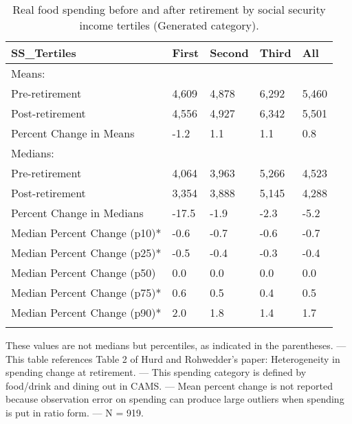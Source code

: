 \begin{table}[tbp] \centering
{}

\caption{Real food spending before and after retirement by social security income tertiles (Generated category).}
\begin{tabularx}{\textwidth}{lCCCC}

\toprule
{SS\_Tertiles}&{First}&{Second}&{Third}&{All} \tabularnewline
\midrule\addlinespace[1.5ex]
Means:&&&& \tabularnewline
\midrule Pre-retirement&4,609&4,878&6,292&5,460 \tabularnewline
Post-retirement&4,556&4,927&6,342&5,501 \tabularnewline
Percent Change in Means&-1.2&1.1&1.1&0.8 \tabularnewline
\midrule Medians:&&&& \tabularnewline
\midrule Pre-retirement&4,064&3,963&5,266&4,523 \tabularnewline
Post-retirement&3,354&3,888&5,145&4,288 \tabularnewline
Percent Change in Medians&-17.5&-1.9&-2.3&-5.2 \tabularnewline
Median Percent Change (p10)*&-0.6&-0.7&-0.6&-0.7 \tabularnewline
Median Percent Change (p25)*&-0.5&-0.4&-0.3&-0.4 \tabularnewline
Median Percent Change (p50)&0.0&0.0&0.0&0.0 \tabularnewline
Median Percent Change (p75)*&0.6&0.5&0.4&0.5 \tabularnewline
Median Percent Change (p90)*&2.0&1.8&1.4&1.7 \tabularnewline
\bottomrule \addlinespace[1.5ex]

\end{tabularx}
\begin{flushleft}
\footnotesize *These values are not medians but percentiles, as indicated in the parentheses. \linebreak --- \linebreak This table references Table 2 of Hurd and Rohwedder's paper: Heterogeneity in spending change at retirement. \linebreak --- \linebreak This spending category is defined by food/drink and dining out in CAMS. \linebreak --- \linebreak Mean percent change is not reported because observation error on spending can produce large outliers when spending is put in ratio form. \linebreak --- \linebreak N = 919.
\end{flushleft}
\end{table}
